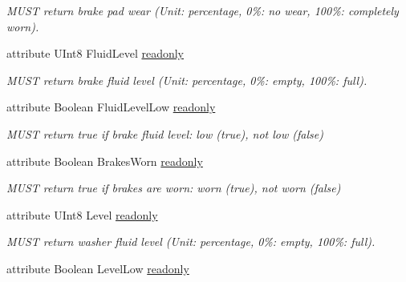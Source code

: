 \begin{DoxyCompactItemize}
\begin{DoxyCompactList}\small\item\em M\+U\+S\+T return brake pad wear (Unit\+: percentage, 0\%\+: no wear, 100\%\+: completely worn). \end{DoxyCompactList}\item 
\hypertarget{interfaceVehiclePropertyType_adfe93bb0d1a3a9ee9e0508dae8102b65}{attribute U\+Int8 Fluid\+Level \hyperlink{interfaceVehiclePropertyType_adfe93bb0d1a3a9ee9e0508dae8102b65}{readonly}}\label{interfaceVehiclePropertyType_adfe93bb0d1a3a9ee9e0508dae8102b65}

\begin{DoxyCompactList}\small\item\em M\+U\+S\+T return brake fluid level (Unit\+: percentage, 0\%\+: empty, 100\%\+: full). \end{DoxyCompactList}\item 
\hypertarget{interfaceVehiclePropertyType_a1417a3eb00b00a34ed81c19037c71edc}{attribute Boolean Fluid\+Level\+Low \hyperlink{interfaceVehiclePropertyType_a1417a3eb00b00a34ed81c19037c71edc}{readonly}}\label{interfaceVehiclePropertyType_a1417a3eb00b00a34ed81c19037c71edc}

\begin{DoxyCompactList}\small\item\em M\+U\+S\+T return true if brake fluid level\+: low (true), not low (false) \end{DoxyCompactList}\item 
\hypertarget{interfaceVehiclePropertyType_a04a633cdc80cecf15929ca37ac245205}{attribute Boolean Brakes\+Worn \hyperlink{interfaceVehiclePropertyType_a04a633cdc80cecf15929ca37ac245205}{readonly}}\label{interfaceVehiclePropertyType_a04a633cdc80cecf15929ca37ac245205}

\begin{DoxyCompactList}\small\item\em M\+U\+S\+T return true if brakes are worn\+: worn (true), not worn (false) \end{DoxyCompactList}\item 
\hypertarget{interfaceVehiclePropertyType_a695d0842a00451d3aaf9fafeb4f3154b}{attribute U\+Int8 Level \hyperlink{interfaceVehiclePropertyType_a695d0842a00451d3aaf9fafeb4f3154b}{readonly}}\label{interfaceVehiclePropertyType_a695d0842a00451d3aaf9fafeb4f3154b}

\begin{DoxyCompactList}\small\item\em M\+U\+S\+T return washer fluid level (Unit\+: percentage, 0\%\+: empty, 100\%\+: full). \end{DoxyCompactList}\item 
\hypertarget{interfaceVehiclePropertyType_a67ff17fcdd746a3e1d2217a0fcd07119}{attribute Boolean Level\+Low \hyperlink{interfaceVehiclePropertyType_a67ff17fcdd746a3e1d2217a0fcd07119}{readonly}}\label{interfaceVehiclePropertyType_a67ff17fcdd746a3e1d2217a0fcd07119}


\end{DoxyCompactItemize}

